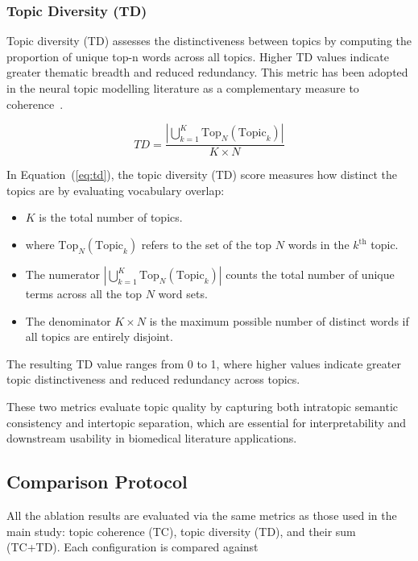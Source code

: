 \documentclass[authorproof,JACIII,researchpaper]{fujipressarticle}
\begin{document}
\subsubsection{Topic Diversity (TD)}

Topic diversity (TD) assesses the distinctiveness between topics by computing the proportion of unique top-n words across all topics. Higher TD values indicate greater thematic breadth and reduced redundancy. This metric has been adopted in the neural topic modelling literature as a complementary measure to coherence~\cite{dieng_topic_2020}.

\begin{equation}
TD = \frac{\left|\bigcup_{k=1}^{K} \text{Top}_N(\text{Topic}_k)\right|}{K \times N}
\label{eq:td}
\end{equation}

{\color{red}In Equation~(\ref{eq:td}), the topic diversity (TD) score measures how distinct the topics are by evaluating vocabulary overlap:}

\begin{itemize}
    \item $K$ is the total number of topics.

    \item where $\text{Top}_N(\text{Topic}_k)$ refers to the set of the top $N$ words in the $k^{\text{th}}$ topic.

    \item The numerator $\left|\bigcup_{k=1}^{K} \text{Top}_N(\text{Topic}_k)\right|$ counts the total number of unique terms across all the top $N$ word sets.

    \item The denominator $K \times N$ is the maximum possible number of distinct words if all topics are entirely disjoint.
\end{itemize}

The resulting TD value ranges from 0 to 1, where higher values indicate greater topic distinctiveness and reduced redundancy across topics.

These two metrics evaluate topic quality by capturing both intratopic semantic consistency and intertopic separation, which are essential for interpretability and downstream usability in biomedical literature applications.

\subsection{Comparison Protocol}
All the ablation results are evaluated via the same metrics as those used in the main study: topic coherence (TC), topic diversity (TD), and their sum (TC+TD). Each configuration is compared against
\end{document}
